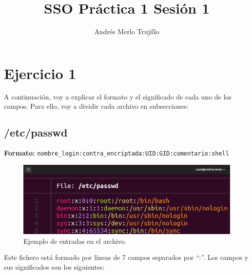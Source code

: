 \documentclass{article}
\title{SSO Práctica 1 Sesión 1}
\author{Andrés Merlo Trujillo}
\date{}
\begin{document}
\maketitle

\tableofcontents

\newpage
{}
\section*{Ejercicio 1}
A continuación, voy a explicar el formato y el significado de cada uno de los campos. Para ello, voy a dividir cada archivo en subsecciones:

\subsection*{/etc/passwd}
\textbf{Formato:} \verb|nombre_login:contra_encriptada:UID:GID:comentario:shell|

\begin{figure}[H]
    \includegraphics[width=\textwidth]{imagenes/passwdfile.png}
    \caption{Ejemplo de entradas en el archivo.}
\end{figure}

\bigskip

Este fichero está formado por líneas de 7 campos separados por ``:''. Los campos y sus significados son los siguientes:
\end{document}
